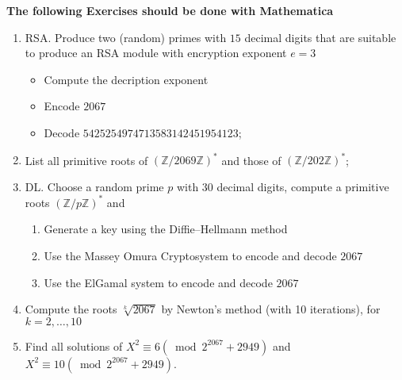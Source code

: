 \documentclass[a4paper]{scrartcl}
\begin{document}
\noindent\textbf{The following Exercises should be done with Mathematica}
\begin{enumerate}
		\item \textsc{RSA.} Produce two (random) primes  with $15$ decimal digits that are suitable
               to produce an RSA module with encryption exponent $e=3$
\begin{itemize}
	\item Compute the decription exponent
        \item Encode $2067$ 
        \item Decode $5425254974713583142451954123$; 
\end{itemize}
		\item List all primitive roots of $(\mathbb Z/2069\mathbb Z)^*$ and those of $(\mathbb Z/202\mathbb Z)^*$;
		\item \textsc{DL.} Choose a random prime $p$ with $30$ decimal digits, compute a primitive roots
                 $(\mathbb Z/p\mathbb Z)^*$ and
\begin{enumerate}
	\item Generate a key using the Diffie--Hellmann method
 	\item Use the Massey Omura Cryptosystem to encode and decode $2067$
	\item Use the ElGamal system to encode and decode $2067$
 \end{enumerate} 
		\item Compute the roots $\sqrt[k]{2067}$ by Newton's method (with 10 iterations), for $k=2,\ldots,10$
		\item Find all solutions of $X^2\equiv 6 (\bmod 2^{2067} + 2949)$ and
			$X^2\equiv 10 (\bmod 2^{2067} + 2949)$. 
\end{enumerate}	
\end{document}
